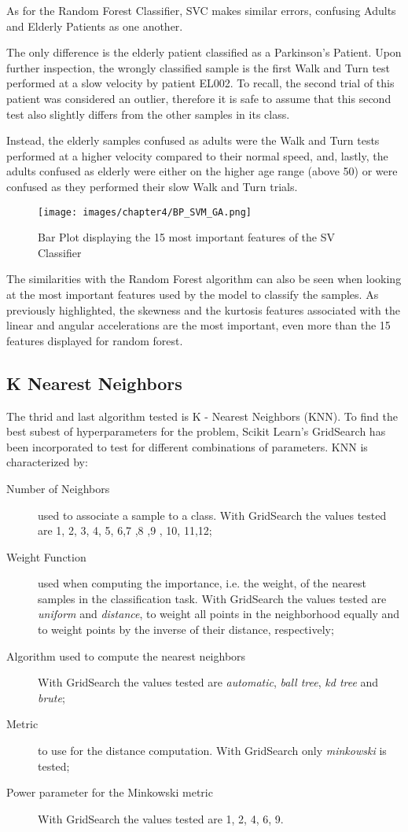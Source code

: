 As for the Random Forest Classifier, SVC makes similar errors, confusing Adults and Elderly Patients as one another. 

The only difference is the elderly patient classified as a Parkinson's Patient. Upon further inspection, the wrongly classified sample is the first Walk and Turn test performed at a slow velocity by patient EL002. To recall, the second trial of this patient was considered an outlier, therefore it is safe to assume that this second test also slightly differs from the other samples in its class.


Instead, the elderly samples confused as adults were the Walk and Turn tests performed at a higher velocity compared to their normal speed, and, lastly, the adults confused as elderly were either on the higher age range (above 50) or were confused as they performed their slow Walk and Turn trials.

\begin{figure}[h!]
    \centering
    \texttt{[image: images/chapter4/BP\_SVM\_GA.png]}
    \caption{Bar Plot displaying the 15 most important features of the SV Classifier}
    \label{fig:BP_SVM_GA}
\end{figure}

The similarities with the Random Forest algorithm can also be seen when looking at the most important features used by the model to classify the samples. As previously highlighted, the skewness and the kurtosis features associated with the linear and angular accelerations are the most important, even more than the 15 features displayed for random forest.

\subsection{K Nearest Neighbors}
The thrid and last algorithm tested is K - Nearest Neighbors (KNN). 
To find the best subest of hyperparameters for the problem, Scikit Learn's GridSearch has been incorporated to test for different combinations of parameters.
KNN is characterized by:
\begin{description}
    \item[Number of Neighbors] used to associate a sample to a class. With GridSearch the values tested are 1, 2, 3, 4, 5, 6,7 ,8 ,9 , 10, 11,12;
    \item[Weight Function] used when computing the importance, i.e. the weight, of the nearest samples in the classification task. With GridSearch the values tested are \textit{uniform} and \textit{distance}, to weight all points in the neighborhood equally and to weight points by the inverse of their distance, respectively;
    \item[Algorithm used to compute the nearest neighbors] With GridSearch the values tested are \textit{automatic}, \textit{ball tree}, \textit{kd tree} and \textit{brute};
    \item[Metric]  to use for the distance computation. With GridSearch only \textit{minkowski} is tested;
    \item[Power parameter for the Minkowski metric]  With GridSearch the values tested are 1, 2, 4, 6, 9.
\end{description}

